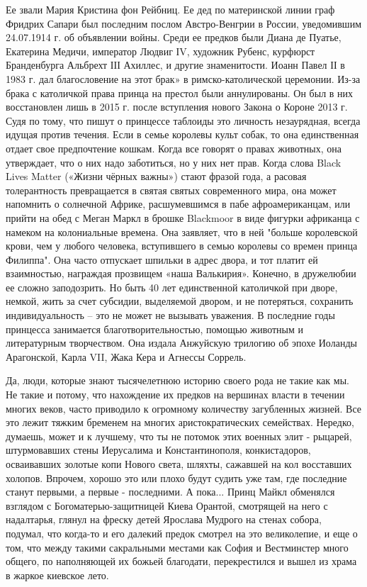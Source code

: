 Ее звали Мария Кристина фон Рейбниц. Ее дед по материнской линии граф Фридрих
Сапари был последним послом Австро-Венгрии в России, уведомившим 24.07.1914 г.
об объявлении войны. Среди ее предков были Диана де Пуатье, Екатерина Медичи,
император Людвиг ІV, художник Рубенс, курфюрст Бранденбурга Альбрехт ІІІ
Ахиллес, и другие знаменитости. Иоанн Павел ІІ в 1983 г. дал благословение на
этот брак» в римско-католической церемонии. Из-за брака с католичкой права
принца на престол были аннулированы. Он был в них восстановлен лишь в 2015 г.
после вступления нового Закона о Короне 2013 г. Судя по тому, что пишут о
принцессе таблоиды это личность незаурядная, всегда идущая против течения. Если
в семье королевы культ собак, то она единственная отдает свое предпочтение
кошкам. Когда все говорят о правах животных, она утверждает, что о них надо
заботиться, но у них нет прав. Когда слова Black Lives Matter («Жизни чёрных
важны») стают фразой года, а расовая толерантность превращается в святая святых
современного мира, она может напомнить о солнечной Африке, расшумевшимся в пабе
афроамериканцам, или прийти на обед с Меган Маркл в брошке Blackmoor в виде
фигурки африканца с намеком на колониальные времена. Она заявляет, что в ней
"больше королевской крови, чем у любого человека, вступившего в семью королевы
со времен принца Филиппа". Она часто отпускает шпильки в адрес двора, и тот
платит ей взаимностью, награждая прозвищем «наша Валькирия». Конечно, в
дружелюбии ее сложно заподозрить. Но быть 40 лет единственной католичкой при
дворе, немкой, жить за счет субсидии, выделяемой двором, и не потеряться,
сохранить индивидуальность – это не может не вызывать уважения. В последние
годы принцесса занимается благотворительностью, помощью животным и литературным
творчеством. Она издала Анжуйскую трилогию об эпохе Иоланды Арагонской, Карла
VII, Жака Кера и Агнессы Соррель.

Да, люди, которые знают тысячелетнюю историю своего рода не такие как мы. Не
такие и потому, что нахождение их предков на вершинах власти в течении многих
веков, часто приводило  к огромному количеству загубленных жизней. Все это
лежит тяжким бременем на многих аристократических семействах. Нередко, думаешь,
может и к лучшему, что ты не потомок этих  военных элит - рыцарей, штурмовавших
стены Иерусалима и Константинополя, конкистадоров, осваивавших золотые копи
Нового света, шляхты, сажавшей на кол восставших холопов. Впрочем, хорошо это
или плохо будут судить уже там, где последние станут первыми, а первые -
последними. А пока... Принц Майкл обменялся взглядом с Богоматерью-защитницей
Киева Орантой, смотрящей на него с надалтарья, глянул на фреску детей Ярослава
Мудрого на стенах собора, подумал, что когда-то и его далекий предок смотрел на
это великолепие, и еще о том, что между такими сакральными местами как София и
Вестминстер много общего, по наполняющей их божьей благодати, перекрестился и
вышел из храма в жаркое киевское лето.
